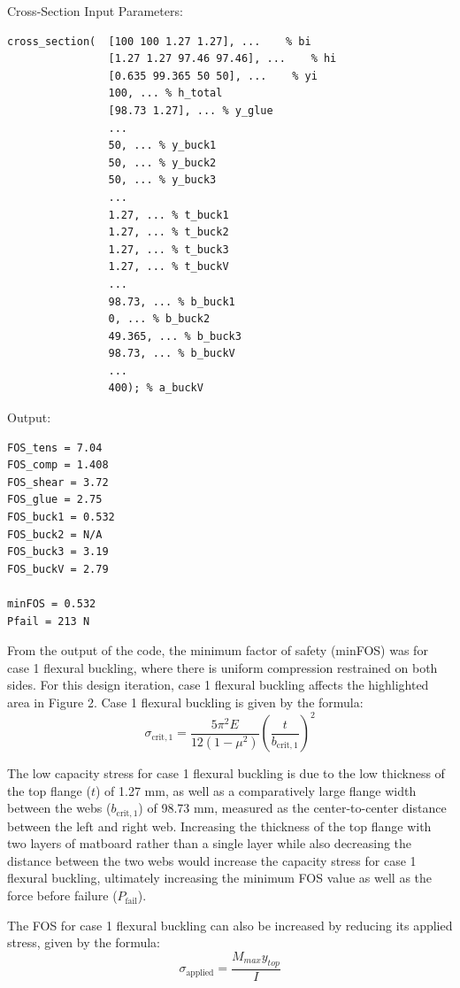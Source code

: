 \documentclass[11pt]{article}
\begin{document}
Cross-Section Input Parameters:
\begin{lstlisting}[]
cross_section(  [100 100 1.27 1.27], ...    % bi
                [1.27 1.27 97.46 97.46], ...    % hi
                [0.635 99.365 50 50], ...    % yi
                100, ... % h_total 
                [98.73 1.27], ... % y_glue
                ...
                50, ... % y_buck1
                50, ... % y_buck2
                50, ... % y_buck3
                ...
                1.27, ... % t_buck1
                1.27, ... % t_buck2
                1.27, ... % t_buck3
                1.27, ... % t_buckV
                ...
                98.73, ... % b_buck1
                0, ... % b_buck2
                49.365, ... % b_buck3
                98.73, ... % b_buckV
                ...
                400); % a_buckV
\end{lstlisting}

Output:
\begin{lstlisting}[]
FOS_tens = 7.04
FOS_comp = 1.408
FOS_shear = 3.72
FOS_glue = 2.75
FOS_buck1 = 0.532
FOS_buck2 = N/A
FOS_buck3 = 3.19
FOS_buckV = 2.79

minFOS = 0.532
Pfail = 213 N
\end{lstlisting}

From the output of the code, the minimum factor of safety (minFOS) was for case 1 flexural buckling, where there is uniform compression restrained on both sides. For this design iteration, case 1 flexural buckling affects the highlighted area in Figure 2. Case 1 flexural buckling is given by the formula:
\[\sigma_{\mathrm{crit,1}}=\frac{5\pi^2E}{12\left(1-\mu^2\right)}\left(\frac{t}{b_{\mathrm{crit,1}}}\right)^2\]

The low capacity stress for case 1 flexural buckling is due to the low thickness of the top flange ($t$) of 1.27 mm, as well as a comparatively large flange width between the webs ($b_{\mathrm{crit,1}}$) of 98.73 mm, measured as the center-to-center distance between the left and right web. Increasing the thickness of the top flange with two layers of matboard rather than a single layer while also decreasing the distance between the two webs would increase the capacity stress for case 1 flexural buckling, ultimately increasing the minimum FOS value as well as the force before failure ($P_{\mathrm{fail}}$).

The FOS for case 1 flexural buckling can also be increased by reducing its applied stress, given by the formula:
\[\sigma_{\mathrm{applied}}=\frac{M_{max}y_{top}}{I}\]
\end{document}
